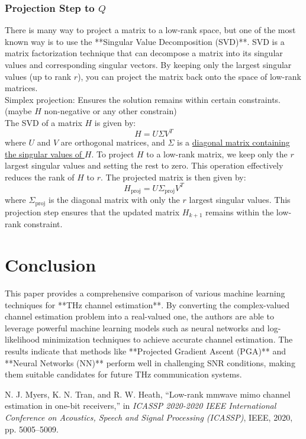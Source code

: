 \documentclass{article}
\begin{document}
\subsubsection*{Projection Step to $Q$}
There is many way to project a matrix to a low-rank space, but one of the most known way is to use the **Singular Value Decomposition (SVD)**. SVD is a matrix factorization technique that can decompose a matrix into its singular values and corresponding singular vectors. By keeping only the largest singular values (up to rank $r$), you can project the matrix back onto the space of low-rank matrices.\\ Simplex projection: Ensures the solution remains within certain constraints.(maybe $H$ non-negative or any other constrain) \\ 
The SVD of a matrix \( H \) is given by:
\[
H = U \Sigma V^T
\]
where \( U \) and \( V \) are orthogonal matrices, and \( \Sigma \) is a \underline{diagonal matrix containing } \underline{the singular values of \( H \)}. To project \( H \) to a low-rank matrix, we keep only the \( r \) largest singular values and setting the rest to zero. This operation effectively reduces the rank of \( H \) to \( r \). The projected matrix is then given by:
\[
H_{\text{proj}} = U \Sigma_{\text{proj}} V^T
\]
where \( \Sigma_{\text{proj}} \) is the diagonal matrix with only the \( r \) largest singular values. This projection step ensures that the updated matrix \( H_{k+1} \) remains within the low-rank constraint. \\



\section{Conclusion}

This paper provides a comprehensive comparison of various machine learning techniques for **THz channel estimation**. By converting the complex-valued channel estimation problem into a real-valued one, the authors are able to leverage powerful machine learning models such as neural networks and log-likelihood minimization techniques to achieve accurate channel estimation. The results indicate that methods like **Projected Gradient Ascent (PGA)** and **Neural Networks (NN)** perform well in challenging SNR conditions, making them suitable candidates for future THz communication systems.
\begin{thebibliography}{9}
  N. J. Myers, K. N. Tran, and R. W. Heath, “Low-rank mmwave mimo channel estimation in one-bit receivers,” in \textit{ICASSP 2020-2020 IEEE International Conference on Acoustics, Speech and Signal Processing (ICASSP)}, IEEE, 2020, pp. 5005–5009.
  \end{thebibliography}
\end{document}
